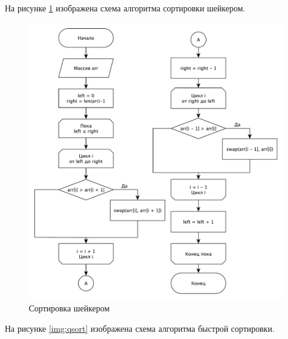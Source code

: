 \documentclass[a4paper,12pt]{article}
\begin{document}
На рисунке \ref{img:shaker} изображена схема алгоритма сортировки шейкером.

\begin{figure}[H]
    \centering
    \includegraphics[scale=0.8]{Shaker}
    \caption{Сортировка шейкером}
    \label{img:shaker}
\end{figure}

На рисунке \ref{img:qsort} изображена схема алгоритма быстрой сортировки.
\end{document}
